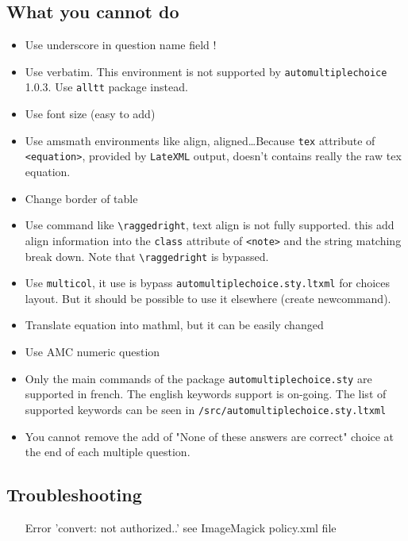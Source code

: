 \documentclass[a4paper]{article}
\newcommand{\elem}[1]{\texttt{<#1>}}
\begin{document}
\subsection{What you cannot do}\label{sec:cannot}
\begin{itemize}
\item Use underscore in question name field !
\item Use verbatim. This environment is not supported by \texttt{automultiplechoice} 1.0.3. Use \texttt{alltt} package instead.
\item Use font size (easy to add)
\item Use amsmath environments like align, aligned\dots Because  \texttt{tex} attribute of \elem{equation}, provided by \texttt{LateXML} output, doesn't contains really the raw tex equation.
\item Change border of table
\item Use command like \texttt{\textbackslash raggedright}, text align is not fully supported. this add align information into the \texttt{class} attribute of \elem{note} and the string matching break down. Note that \texttt{\textbackslash raggedright} is bypassed. %
\item Use \texttt{multicol}, it use is bypass \texttt{automultiplechoice.sty.ltxml} for choices layout. But it should be possible to use it elsewhere (create newcommand).
\item Translate equation into mathml, but it can be easily changed
\item Use AMC numeric question
\item Only the main commands of the package \texttt{automultiplechoice.sty} are supported in french. The english keywords support is on-going. The list of supported keywords can be seen in \texttt{/src/automultiplechoice.sty.ltxml}
\item You cannot remove the add of "None of these answers are correct" choice at the end of each multiple question.


\end{itemize}


\subsection{Troubleshooting}
\begin{itemize}
\item[Error] 'convert: not authorized..' see ImageMagick policy.xml file
\end{itemize}
 
\end{document}
